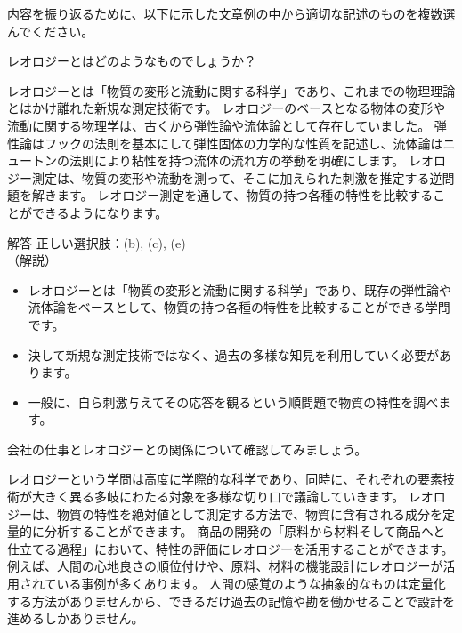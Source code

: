 \documentclass[uplatex,dvipdfmx,a4paper,11pt]{jsarticle}
\begin{document}
内容を振り返るために、以下に示した文章例の中から適切な記述のものを複数選んでください。
\begin{qlist}
	\qitem レオロジーとはどのようなものでしょうか？
		\begin{qlist2}
			\qitem レオロジーとは「物質の変形と流動に関する科学」であり、これまでの物理理論とはかけ離れた新規な測定技術です。
			\qitem レオロジーのベースとなる物体の変形や流動に関する物理学は、古くから弾性論や流体論として存在していました。
			\qitem 弾性論はフックの法則を基本にして弾性固体の力学的な性質を記述し、流体論はニュートンの法則により粘性を持つ流体の流れ方の挙動を明確にします。
			\qitem レオロジー測定は、物質の変形や流動を測って、そこに加えられた刺激を推定する逆問題を解きます。
			\qitem レオロジー測定を通して、物質の持つ各種の特性を比較することができるようになります。
    \end{qlist2}
    \vspace{3mm}
    \begin{itembox}[l]{解答}
        正しい選択肢：(b), (c), (e)\\
        （解説）
        \begin{itemize}
            \item レオロジーとは「物質の変形と流動に関する科学」であり、既存の弾性論や流体論をベースとして、物質の持つ各種の特性を比較することができる学問です。
            \item 決して新規な測定技術ではなく、過去の多様な知見を利用していく必要があります。
            \item 一般に、自ら刺激与えてその応答を観るという順問題で物質の特性を調べます。
        \end{itemize}
    \end{itembox}
	\qitem 会社の仕事とレオロジーとの関係について確認してみましょう。
		\begin{qlist2}
			\qitem レオロジーという学問は高度に学際的な科学であり、同時に、それぞれの要素技術が大きく異る多岐にわたる対象を多様な切り口で議論していきます。
			\qitem レオロジーは、物質の特性を絶対値として測定する方法で、物質に含有される成分を定量的に分析することができます。
			\qitem 商品の開発の「原料から材料そして商品へと仕立てる過程」において、特性の評価にレオロジーを活用することができます。
            \qitem 例えば、人間の心地良さの順位付けや、原料、材料の機能設計にレオロジーが活用されている事例が多くあります。
            \qitem 人間の感覚のような抽象的なものは定量化する方法がありませんから、できるだけ過去の記憶や勘を働かせることで設計を進めるしかありません。
    \end{qlist2}

\end{qlist}
\end{document}

